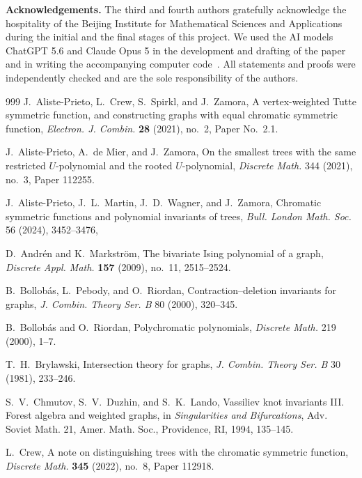 \documentclass[11pt]{article}
\theoremstyle{plain}
\theoremstyle{definition}
\numberwithin{equation}{section}
\begin{document}
\medskip

\noindent
\textbf{Acknowledgements.} The third and fourth authors gratefully acknowledge the hospitality
of the Beijing Institute for Mathematical Sciences and Applications during
the initial and the final stages of this project.
%
We used the AI models ChatGPT 5.6 and Claude Opus 5 in the development and drafting of the paper
and in writing the accompanying computer code~\cite{code}.
All statements and proofs were independently checked and are the sole responsibility of the authors.

 \begin{thebibliography}{999}
  J.~Aliste-Prieto, L.~Crew, S.~Spirkl, and J.~Zamora,
  A vertex-weighted Tutte symmetric function, and constructing graphs with equal chromatic symmetric function,
  \emph{Electron. J. Combin.} \textbf{28} (2021), no.~2, Paper No.~2.1.

  J.~Aliste-Prieto, A.~de Mier, and J.~Zamora,
  On the smallest trees with the same restricted $U$-polynomial and the
  rooted $U$-polynomial,
  \emph{Discrete Math.} 344 (2021), no.~3, Paper 112255.

 J.~Aliste-Prieto, J.~L.~Martin, J.~D.~Wagner, and J.~Zamora,
  Chromatic symmetric functions and polynomial invariants of trees,
  \emph{Bull. London Math. Soc.} 56 (2024), 3452--3476,


  D.~Andr\'en and K.~Markstr\"om,
  The bivariate Ising polynomial of a graph,
  \emph{Discrete Appl. Math.} \textbf{157} (2009), no.~11, 2515--2524.

  B.~Bollob\'as, L.~Pebody, and O.~Riordan,
  Contraction--deletion invariants for graphs,
  \emph{J. Combin. Theory Ser. B} 80 (2000), 320--345.

  B.~Bollob\'as and O.~Riordan,
  Polychromatic polynomials,
  \emph{Discrete Math.} 219 (2000), 1--7.

  T.~H.~Brylawski,
  Intersection theory for graphs,
  \emph{J. Combin. Theory Ser. B} 30 (1981), 233--246.

  S.~V.~Chmutov, S.~V.~Duzhin, and S.~K.~Lando,
  Vassiliev knot invariants III. Forest algebra and weighted graphs,
  in \emph{Singularities and Bifurcations},
  Adv. Soviet Math. 21, Amer. Math. Soc., Providence, RI, 1994, 135--145.

  L.~Crew,
  A note on distinguishing trees with the chromatic symmetric function,
  \emph{Discrete Math.} \textbf{345} (2022), no.~8, Paper 112918.


\end{thebibliography}
\end{document}
